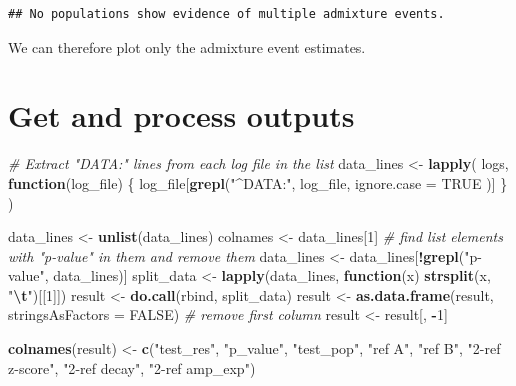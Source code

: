\documentclass[
]{article}
\newenvironment{Shaded}{\begin{snugshade}}{\end{snugshade}}
\newcommand{\AttributeTok}[1]{\textcolor[rgb]{0.13,0.29,0.53}{#1}}
\newcommand{\CommentTok}[1]{\textcolor[rgb]{0.56,0.35,0.01}{\textit{#1}}}
\newcommand{\ConstantTok}[1]{\textcolor[rgb]{0.56,0.35,0.01}{#1}}
\newcommand{\ControlFlowTok}[1]{\textcolor[rgb]{0.13,0.29,0.53}{\textbf{#1}}}
\newcommand{\DecValTok}[1]{\textcolor[rgb]{0.00,0.00,0.81}{#1}}
\newcommand{\FunctionTok}[1]{\textcolor[rgb]{0.13,0.29,0.53}{\textbf{#1}}}
\newcommand{\NormalTok}[1]{#1}
\newcommand{\OtherTok}[1]{\textcolor[rgb]{0.56,0.35,0.01}{#1}}
\newcommand{\SpecialCharTok}[1]{\textcolor[rgb]{0.81,0.36,0.00}{\textbf{#1}}}
\newcommand{\StringTok}[1]{\textcolor[rgb]{0.31,0.60,0.02}{#1}}
\begin{document}
\begin{verbatim}
## No populations show evidence of multiple admixture events.
\end{verbatim}

We can therefore plot only the admixture event estimates.

\section{Get and process outputs}\label{get-and-process-outputs}

\begin{Shaded}
\begin{Highlighting}[]
\CommentTok{\# Extract "DATA:" lines from each log file in the list}
\NormalTok{data\_lines }\OtherTok{\textless{}{-}} \FunctionTok{lapply}\NormalTok{(}
\NormalTok{  logs,}
  \ControlFlowTok{function}\NormalTok{(log\_file) \{}
\NormalTok{    log\_file[}\FunctionTok{grepl}\NormalTok{(}\StringTok{"\^{}DATA:"}\NormalTok{,}
\NormalTok{      log\_file,}
      \AttributeTok{ignore.case =} \ConstantTok{TRUE}
\NormalTok{    )]}
\NormalTok{  \}}
\NormalTok{)}

\NormalTok{data\_lines }\OtherTok{\textless{}{-}} \FunctionTok{unlist}\NormalTok{(data\_lines)}
\NormalTok{colnames }\OtherTok{\textless{}{-}}\NormalTok{ data\_lines[}\DecValTok{1}\NormalTok{]}
\CommentTok{\# find list elements with "p{-}value" in them and remove them}
\NormalTok{data\_lines }\OtherTok{\textless{}{-}}\NormalTok{ data\_lines[}\SpecialCharTok{!}\FunctionTok{grepl}\NormalTok{(}\StringTok{"p{-}value"}\NormalTok{, data\_lines)]}
\NormalTok{split\_data }\OtherTok{\textless{}{-}} \FunctionTok{lapply}\NormalTok{(data\_lines, }\ControlFlowTok{function}\NormalTok{(x) }\FunctionTok{strsplit}\NormalTok{(x, }\StringTok{"}\SpecialCharTok{\textbackslash{}t}\StringTok{"}\NormalTok{)[[}\DecValTok{1}\NormalTok{]])}
\NormalTok{result }\OtherTok{\textless{}{-}} \FunctionTok{do.call}\NormalTok{(rbind, split\_data)}
\NormalTok{result }\OtherTok{\textless{}{-}} \FunctionTok{as.data.frame}\NormalTok{(result, }\AttributeTok{stringsAsFactors =} \ConstantTok{FALSE}\NormalTok{)}
\CommentTok{\# remove first column}
\NormalTok{result }\OtherTok{\textless{}{-}}\NormalTok{ result[, }\SpecialCharTok{{-}}\DecValTok{1}\NormalTok{]}

\FunctionTok{colnames}\NormalTok{(result) }\OtherTok{\textless{}{-}} \FunctionTok{c}\NormalTok{(}\StringTok{"test\_res"}\NormalTok{, }\StringTok{"p\_value"}\NormalTok{, }\StringTok{"test\_pop"}\NormalTok{, }\StringTok{"ref A"}\NormalTok{, }\StringTok{"ref B"}\NormalTok{, }\StringTok{"2{-}ref z{-}score"}\NormalTok{, }\StringTok{"2{-}ref decay"}\NormalTok{, }\StringTok{"2{-}ref amp\_exp"}\NormalTok{)}


\end{Highlighting}
\end{Shaded}
\end{document}
